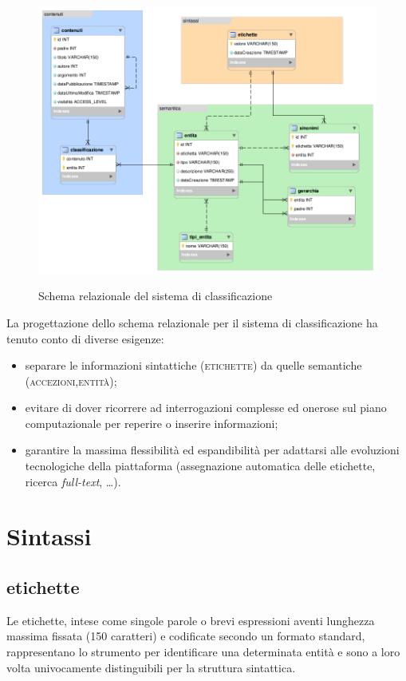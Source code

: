 \documentclass[10pt,a4paper,headinclude,footinclude,hidelinks]{scrreprt} %
\begin{document}
	\begin{figure}[ht]
		\begin{center}
	    	\includegraphics[width=14cm]{modello-er.png}
			\label{gfx:schema-relazionale}
			\caption{Schema relazionale del sistema di classificazione}
		\end{center}
	\end{figure}

	La progettazione dello schema relazionale per il sistema di classificazione ha tenuto conto di diverse esigenze:
	\begin{itemize}
	\item separare le informazioni sintattiche (\textsc{etichette}) da quelle semantiche (\textsc{accezioni},\textsc{entità});
	\item evitare di dover ricorrere ad interrogazioni complesse ed onerose sul piano computazionale per reperire o inserire informazioni;
	\item garantire la massima flessibilità ed espandibilità per adattarsi alle evoluzioni tecnologiche della piattaforma (assegnazione automatica delle etichette, ricerca \textit{full-text}, \ldots).
	\end{itemize}

	\section{Sintassi}
	\subsection{etichette}
	Le etichette, intese come singole parole o brevi espressioni aventi lunghezza massima fissata (150 caratteri) e codificate secondo un formato standard, rappresentano lo strumento per identificare una determinata entità e sono a loro volta univocamente distinguibili per la struttura sintattica.
\end{document}
